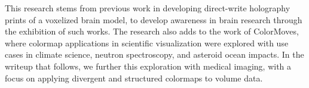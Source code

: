 This research stems from previous work in developing direct-write holography prints of a voxelized brain model, to develop awareness in brain research through the exhibition of such works.  The research also adds to the work of ColorMoves, where colormap applications in scientific visualization were explored with use cases in climate science, neutron spectroscopy, and asteroid ocean impacts.  In the writeup that follows, we further this exploration with medical imaging, with a focus on applying divergent and structured colormaps to volume data.
